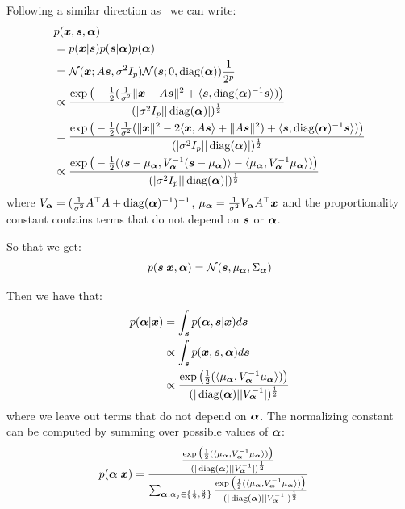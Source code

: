 Following a similar direction as~\cite{moulines1997maximum} we can write:
\begin{align}
  &p(\boldsymbol{x}, \boldsymbol{s}, \boldsymbol{\alpha}) \\
  &= p(\boldsymbol{x} | \boldsymbol{s}) p(\boldsymbol{s}|\boldsymbol{\alpha})p(\boldsymbol{\alpha}) \\
                        &= \mathcal{N}(\boldsymbol{x}; A\boldsymbol{s}, \sigma^2 I_p)\mathcal{N}( \boldsymbol{s}; 0, \operatorname*{diag}(\boldsymbol{\alpha})) \frac1{2^p} \\
  &\propto \frac{\exp\big(-\frac12(\frac1{ \sigma^2}\|\boldsymbol{x} - A\boldsymbol{s} \|^2 + \langle \boldsymbol{s} , \operatorname*{diag}(\boldsymbol{\alpha})^{-1} \boldsymbol{s}\rangle)\big)}{(|\sigma^2 I_p| |\operatorname*{diag}(\boldsymbol{\alpha})|)^{\frac12}}  \\
  &= \frac{\exp\big(-\frac12(\frac1{ \sigma^2}(\|\boldsymbol{x} \|^2 - 2 \langle \boldsymbol{x}, A \boldsymbol{s} \rangle + \|A \boldsymbol{s} \|^2)  + \langle \boldsymbol{s} , \operatorname*{diag}(\boldsymbol{\alpha})^{-1} \boldsymbol{s}\rangle) \big)}{(|\sigma^2 I_p| |\operatorname*{diag}(\boldsymbol{\alpha})|)^{\frac12}} \\
  &\propto \frac{\exp\big(-\frac12( \langle \boldsymbol{s} - \mu_{\boldsymbol{\alpha}}, V_{\boldsymbol{\alpha}}^{-1} (\boldsymbol{s} - \mu_{\boldsymbol{\alpha}}) \rangle - \langle \mu_{\boldsymbol{\alpha}} ,V_{\boldsymbol{\alpha}}^{-1} \mu_{\boldsymbol{\alpha}} \rangle) \big)}{(|\sigma^2 I_p| |\operatorname*{diag}(\boldsymbol{\alpha})|)^{\frac12}}
\end{align}
where $V_{\boldsymbol{\alpha}} = (\frac1{\sigma^2}A^{\top}A + \operatorname*{diag}(\boldsymbol{\alpha})^{-1})^{-1}$, $\mu_{\boldsymbol{\alpha}} = \frac1{\sigma^2}V_{\boldsymbol{\alpha}}
A^{\top} \boldsymbol{x}$ and the proportionality constant contains terms that do not depend
on $\boldsymbol{s}$ or $\boldsymbol{\alpha}$.

So that we get:
\begin{align}
  p(\boldsymbol{s} | \boldsymbol{x}, \boldsymbol{\alpha}) =  \mathcal{N}(\boldsymbol{s}, \mu_{\boldsymbol{\alpha}}, \Sigma_{\boldsymbol{\alpha}})
\end{align}

Then we have that:
\begin{align}
  p(\boldsymbol{\alpha} | \boldsymbol{x}) &= \int_{\boldsymbol{s}} p(\boldsymbol{\alpha}, \boldsymbol{s} | \boldsymbol{x}) d\boldsymbol{s} \\
                    &\propto \int_{\boldsymbol{s}} p(\boldsymbol{x}, \boldsymbol{s} ,\boldsymbol{\alpha}) d\boldsymbol{s} \\ 
                   &\propto \frac{\exp\big(\frac12(\langle \mu_{\boldsymbol{\alpha}} ,V_{\boldsymbol{\alpha}}^{-1} \mu_{\boldsymbol{\alpha}} \rangle) \big)}{(|\operatorname*{diag}(\boldsymbol{\alpha})| |V_{\boldsymbol{\alpha}}^{-1}|)^{\frac12}}\\ 
\end{align}
where we leave out terms that do not depend on $\boldsymbol{\alpha}$.
The normalizing constant can be computed by summing over possible values of
$\boldsymbol{\alpha}$:
\begin{align}
  p(\boldsymbol{\alpha} | \boldsymbol{x}) &= \frac{\frac{\exp\big(\frac12(\langle \mu_{\boldsymbol{\alpha}} ,V_{\boldsymbol{\alpha}}^{-1} \mu_{\boldsymbol{\alpha}} \rangle) \big)}{(|\operatorname*{diag}(\boldsymbol{\alpha})| |V_{\boldsymbol{\alpha}}^{-1}|)^{\frac12}}}{\sum_{\boldsymbol{\alpha}, \alpha_j \in \{\frac12, \frac32\}} \frac{\exp\big(\frac12(\langle \mu_{\boldsymbol{\alpha}} ,V_{\boldsymbol{\alpha}}^{-1} \mu_{\boldsymbol{\alpha}} \rangle) \big)}{(|\operatorname*{diag}(\boldsymbol{\alpha})| |V_{\boldsymbol{\alpha}}^{-1}|)^{\frac12}}}
\end{align}

